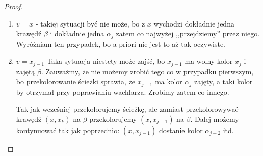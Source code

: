 \begin{proof}
\begin{enumerate}
		\item $v = x$ - takiej sytuacji być nie może, bo z $x$ wychodzi dokładnie jedna krawędź $\beta$ i dokładnie jedna $\alpha_j$ zatem co najwyżej ,,przejdziemy'' przez niego.
		      Wyróżniam ten przypadek, bo a priori nie jest to aż tak oczywiste.

		\item $v = x_{j - 1}$
		      Taka sytuacja niestety może zajść, bo $x_{j-1}$ ma wolny kolor $x_j$ i zajętą $\beta$.
		      Zauważmy, że nie możemy zrobić tego co w przypadku pierwszym, bo przekolorowanie ścieżki sprawia, że $x_{j-1}$ ma kolor $\alpha_j$ zajęty, a taki kolor by otrzymał przy poprawianiu wachlarza. Zrobimy zatem co innego.

		      Tak jak wcześniej przekolorujemy ścieżkę,
		      ale zamiast przekolorowywać krawędź $(x, x_k)$ na $\beta$
		      przekolorujemy $(x, x_{j-1})$ na $\beta$.
		      Dalej możemy kontynuować tak jak poprzednio: $(x, x_{j-1})$ dostanie kolor $\alpha_{j-2}$ itd.



\end{enumerate}
\end{proof}
